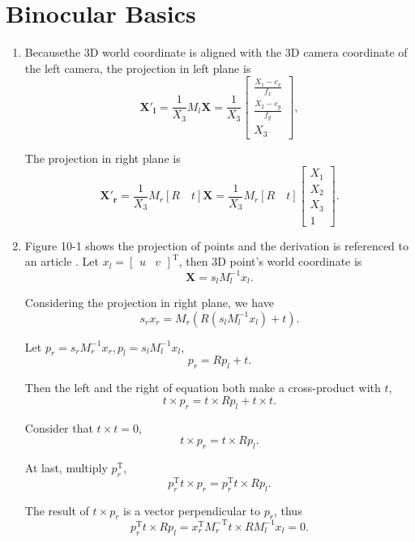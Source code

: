 \documentclass{article}
\begin{document}
\section*{Binocular Basics}

\begin{enumerate}[resume]

\item Becausethe 3D world coordinate is aligned with the 3D camera coordinate of the left camera, the projection in left plane is
$$
\boldsymbol{X'_l} = \frac{1}{X_3} M_l \boldsymbol{X} = \frac{1}{X_3} \begin{bmatrix} \frac{X_1 - c_x}{f_x} \\ \frac{X_2 - c_y}{f_y} \\ X_3 \end{bmatrix} ,
$$

The projection in right plane is
$$
\boldsymbol{X'_r} = \frac{1}{X_3} M_r [R \quad t] \boldsymbol{X} = \frac{1}{X_3} M_r [R \quad t] \begin{bmatrix} X_1 \\ X_2 \\ X_3 \\ 1 \end{bmatrix} .
$$

\item Figure 10-1 shows the projection of points and the derivation is referenced to an article \cite{ref13}. Let $x_l = \begin{bmatrix} u & v \end{bmatrix}^\mathrm T$, then 3D point's world coordinate is
$$
\boldsymbol X = s_lM_l^{-1}x_l .
$$

Considering the projection in right plane, we have
$$
s_rx_r = M_r(R(s_lM_l^{-1}x_l) + t) .
$$

Let $p_r = s_rM_r^{-1}x_r, p_l = s_lM_l^{-1}x_l$,
$$
p_r = Rp_l + t.
$$

Then the left and the right of equation both make a cross-product with $t$,
$$
t \times p_r = t \times Rp_l + t \times t .
$$

Consider that $t \times t = 0$,
$$
t \times p_r = t \times Rp_l .
$$

At last, multiply $p_r^\mathrm T$,
$$
p_r^\mathrm T t \times p_r = p_r^\mathrm T t \times Rp_l .
$$

The result of $t \times p_r$ is a vector perpendicular to $p_r$, thus
$$
p_r^\mathrm T t \times Rp_l = x_r^\mathrm T M_r^{-\mathrm T} t \times R M_l^{-1}x_l= 0 .
$$


\end{enumerate}
\end{document}
